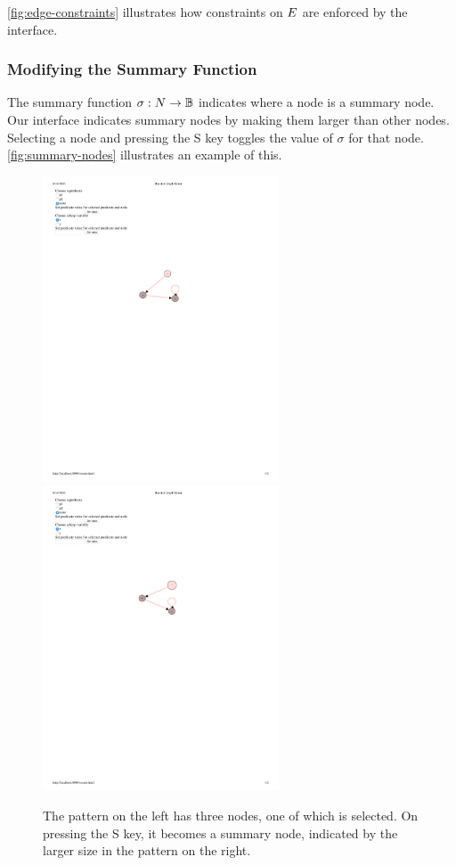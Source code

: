 \autoref{fig:edge-constraints} illustrates how constraints on $E$ are enforced by the interface.

\subsubsection{Modifying the Summary Function}
The summary function $\sigma: N \to \mathbb{B}$ indicates where a node is a summary node. Our interface indicates summary nodes by making them larger than other nodes. Selecting a node and pressing the S key toggles the value of $\sigma$ for that node. \autoref{fig:summary-nodes} illustrates an example of this.

\begin{figure}
  \centering
  \includegraphics[width=7cm]{fig/summary1.pdf}
  \includegraphics[width=7cm]{fig/summary2.pdf}
  \caption{The pattern on the left has three nodes, one of which is selected. On pressing the S key, it becomes a summary node, indicated by the larger size in the pattern on the right.}
  \label{fig:summary-nodes}
\end{figure}

